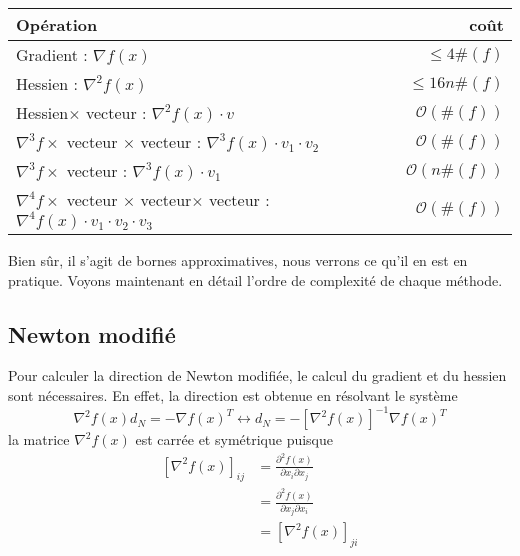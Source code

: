 \begin{center}
\begin{tabular}{|l|r|}\hline
Op\'eration  & coût \\\hline
Gradient : $\nabla f(x)$ & $\leq 4\#(f)$ \\
Hessien : $\nabla^2 f(x)$ & $\leq 16n\#(f)$ \\
Hessien$\times$ vecteur : $\nabla^2 f(x)\cdot v$ & $\mathcal{O}(\#(f))$\\
$\nabla^3 f\times$ vecteur $\times$ vecteur : $\nabla^3 f(x)\cdot v_1\cdot v_2$ & $\mathcal{O}(\#(f))$\\
$\nabla^3 f\times$ vecteur : $\nabla^3 f(x)\cdot v_1$ & $\mathcal{O}(n\#(f))$\\
$\nabla^4 f\times$ vecteur $\times$ vecteur$\times$ vecteur : $\nabla^4 f(x)\cdot v_1\cdot v_2\cdot v_3$ & $\mathcal{O}(\#(f))$\\
\hline
\end{tabular}
\end{center}

\noindent
Bien sûr, il s'agit de bornes approximatives, nous verrons ce qu'il en est en pratique. Voyons maintenant en d\'etail
l'ordre de complexit\'e de chaque m\'ethode.



\subsection{Newton modifi\'e}
Pour calculer la direction de Newton modifi\'ee, le calcul du gradient et du hessien sont
 n\'ecessaires. En effet, la direction est obtenue en r\'esolvant le syst\`eme
$$\nabla^2 f(x)d_N=-\nabla f(x)^T\leftrightarrow d_N=-\left[\nabla^2 f(x)\right]^{-1}\nabla f(x)^T$$
la matrice $\nabla^2 f(x)$ est carr\'ee et sym\'etrique puisque
 \begin{align*}
\left[\nabla^2 f(x)\right]_{ij} & =\frac{\partial^2 f(x)}{\partial x_i \partial x_j} \\
				& = \frac{\partial^2 f(x)}{\partial x_j \partial x_i} \\
				& = \left[\nabla^2 f(x)\right]_{ji} 
\end{align*}


